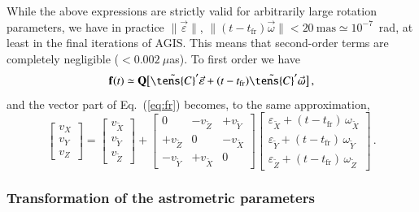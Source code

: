 \documentclass[structabstract]{aa}
\newcommand{\quat}[1]{\mathbf{#1}}
\begin{document}
While the above expressions are strictly valid for arbitrarily large rotation 
parameters, we have in practice $\|\vec{\varepsilon}\|$, 
$\|(t-t_\text{fr})\vec{\omega}\|<20~\text{mas}\simeq 10^{-7}$~rad, 
at least in the final iterations of AGIS. This means that second-order terms are 
completely negligible ($<0.002~\mu$as). To first order we have
\begin{equation}\label{eq:fr2}
\quat{f}(t) \simeq \quat{Q}\big[\tilde{\tens{C}}'\vec{\varepsilon} + 
(t-t_\text{fr})\tilde{\tens{C}}'\vec{\omega}\big] \, ,
\end{equation}
and the vector part of Eq.~(\ref{eq:fr}) becomes, to the same approximation,
\begin{equation}\label{eq:fr3}
\begin{bmatrix} v_X \\ v_Y \\ v_Z \end{bmatrix} =
\begin{bmatrix} v_{\tilde{X}} \\ v_{\tilde{Y}} \\ v_{\tilde{Z}} \end{bmatrix} +
\begin{bmatrix} 0 & -v_{\tilde{Z}} & +v_{\tilde{Y}} \\
+v_{\tilde{Z}} & 0 & -v_{\tilde{X}} \\ 
-v_{\tilde{Y}} & +v_{\tilde{X}} & 0 \end{bmatrix}
\begin{bmatrix} \varepsilon_{\tilde{X}}+(t-t_\text{fr})\,\omega_{\tilde{X}} \\ 
\varepsilon_{\tilde{Y}}+(t-t_\text{fr})\,\omega_{\tilde{Y}} \\
\varepsilon_{\tilde{Z}}+(t-t_\text{fr})\,\omega_{\tilde{Z}}
\end{bmatrix}
\, .
\end{equation}


\subsubsection{Transformation of the astrometric parameters}\label{sec:frameast}
\end{document}
